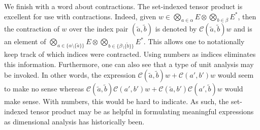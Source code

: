 \documentclass[11pt]{article}
\theoremstyle{remark}
\begin{document}
We finish with a word about contractions. The set-indexed tensor product
is excellent for use with contractions. Indeed, given $w \in
\bigotimes_{a \in \alpha} E \otimes \bigotimes_{b \in \beta} E^{*}$,
then the contraction of $w$ over the index pair $(\tilde a, \tilde b)$
is denoted by $\ensuremath{\mathcal{C}}(\tilde a, \tilde b) w$ and is an element of
$\bigotimes_{a \in \{\alpha \setminus \{\tilde a\} \}} 
E \otimes \bigotimes_{b \in \{\beta \setminus \{\tilde b \}\} }
E^{*}$. This allows one to notationally keep track of which indices
were contracted. Using numbers as indices eliminates this
information. Furthermore, one can also see that a type of unit
analysis may be invoked. In other words, the expression $
\ensuremath{\mathcal{C}}(\tilde a, \tilde b) w + \ensuremath{\mathcal{C}}(a', {b'}) w$ would seem to make
no sense whereas 
$\ensuremath{\mathcal{C}}(\tilde a, \tilde b) \ensuremath{\mathcal{C}}(a',  b') w + 
\ensuremath{\mathcal{C}}(\tilde a,  b') \ensuremath{\mathcal{C}}( a', \tilde b) w$ would make sense. With
numbers, this would be hard to indicate. As such, the set-indexed tensor
product may be as
helpful in formulating meaningful expressions
 as dimensional analysis has historically been.

\clearpage


\end{document}
